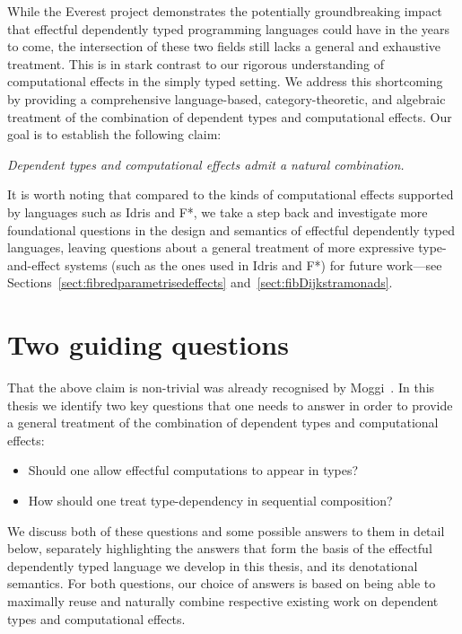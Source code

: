 While the Everest project demonstrates the potentially groundbreaking impact that effectful dependently typed programming languages could have in the years to come, the intersection of these two fields still lacks a general and exhaustive treatment. This is in stark contrast to our rigorous understanding of computational effects in the simply typed setting.
%
We address this shortcoming by providing a comprehensive language-based, category-theoretic, and algebraic treatment of the combination of dependent types and computational effects. 
Our goal is to establish the following claim: 

\vspace{0.2cm}

\begin{displayquote}
\textit{Dependent types and computational effects admit a natural combination.}
\end{displayquote}



It is worth noting that compared to the kinds of computational effects supported by languages such as Idris and F*, we take a step back and investigate more foundational questions in the design and semantics of effectful dependently typed languages, leaving questions about a general treatment of more expressive type-and-effect systems (such as the ones used in Idris and F*) for future work---see Sections~\ref{sect:fibredparametrisedeffects} and~\ref{sect:fibDijkstramonads}.

\section{Two guiding questions}
\label{sect:twoguidingquestions}

That the above claim is non-trivial was already recognised by Moggi~\cite{Moggi:NotionsofComputationandMonads}. In this thesis we identify two key questions that one needs to answer in order to provide a general treatment of the combination of dependent types and computational effects: 
%
\begin{itemize}
\item Should one allow effectful computations to appear in types?
\item How should one treat type-dependency in sequential composition?
\end{itemize}
We discuss both of these questions and some possible answers to them in detail below, separately highlighting the answers that form the basis of the effectful dependently typed language we develop in this thesis, and its denotational semantics. For both questions, our choice of answers is based on being able to maximally reuse and naturally combine respective existing work on dependent types and computational effects.

